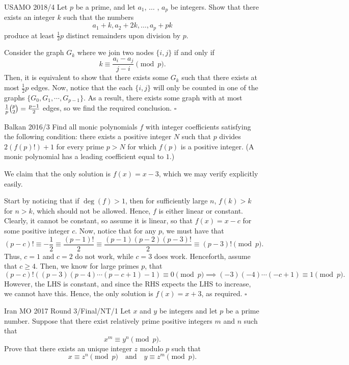 \documentclass{article}
\begin{document}
\begin{problem}[2.14.13]{USAMO 2018/4}
Let $p$ be a prime, and let $a_1$, $\dots$ , $a_p$ be integers. Show that there exists an integer $k$ such that the numbers \[a_1 + k, a_2 + 2k, \dots , a_p + pk\] produce at least $\tfrac{1}{2}p$ distinct remainders upon division by $p$.
\end{problem}

Consider the graph $G_k$ where we join two nodes $\{i, j\}$ if and only if \[k \equiv \dfrac{a_i-a_j}{j-i} \pmod{p}.\] Then, it is equivalent to show that there exists some $G_k$ such that there exists at most $\tfrac{1}{2}p$ edges. Now, notice that the each $\{i, j\}$ will only be counted in one of the graphs $\{G_0, G_1, \cdots, G_{p-1}\}$. As a result, there exists some graph with at most $\tfrac{1}{p}\tbinom{p}{2} = \tfrac{p-1}{2}$ edges, so we find the required conclusion. $\square$

\begin{problem}[2.14.14]{Balkan 2016/3}
Find all monic polynomials $f$ with integer coefficients satisfying the following condition: there exists a positive integer $N$ such that $p$ divides $2(f(p)!) + 1$ for every prime $p > N$ for which $f(p)$ is a positive integer. (A monic polynomial has a leading coefficient equal to $1$.)
\end{problem}

We claim that the only solution is $f(x) = \boxed{x-3}$, which we may verify explicitly easily.

Start by noticing that if $\deg(f) > 1$, then for sufficiently large $n$, $f(k) > k$ for $n > k$, which should not be allowed. Hence, $f$ is either linear or constant. Clearly, it cannot be constant, so assume it is linear, so that $f(x) = x-c$ for some positive integer $c$. Now, notice that for any $p$, we must have that \[(p-c)! \equiv -\dfrac{1}{2} \equiv \dfrac{(p-1)!}{2} \equiv \dfrac{(p-1)(p-2)(p-3)!}{2} \equiv (p-3)! \pmod{p}.\] Thus, $c = 1$ and $c = 2$ do not work, while $c = 3$ does work. Henceforth, assume that $c \ge 4$. Then, we know for large primes $p$, that \[(p-c)!((p-3)(p-4)\cdots(p-c+1)-1) \equiv 0 \pmod{p} \implies (-3)(-4)\cdots(-c+1)\equiv 1 \pmod{p}.\] However, the LHS is constant, and since the RHS expects the LHS to increase, we cannot have this. Hence, the only solution is $f(x) = x+3$, as required. $\square$

\begin{problem}[2.14.15]{Iran MO 2017 Round 3/Final/NT/1}
Let $x$ and $y$ be integers and let $p$ be a prime number. Suppose that there exist relatively prime positive integers $m$ and $n$ such that \[x^m \equiv y^n \pmod{p}.\] Prove that there exists an unique integer $z$ modulo $p$ such that \[x \equiv z^n \pmod{p} \quad \text{and} \quad y \equiv z^m \pmod{p}.\]
\end{problem}
\end{document}
